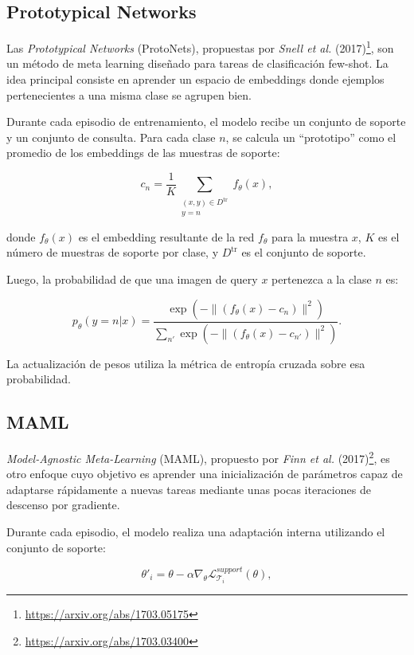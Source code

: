 \subsection{Prototypical Networks}
Las \textit{Prototypical Networks} (ProtoNets), propuestas por \textit{Snell et al.} (2017)\footnote{\url{https://arxiv.org/abs/1703.05175}}, son un método de meta learning diseñado para tareas de clasificación few-shot. La idea principal consiste en aprender un espacio de embeddings donde ejemplos pertenecientes a una misma clase se agrupen bien.

Durante cada episodio de entrenamiento, el modelo recibe un conjunto de soporte y un conjunto de consulta. Para cada clase $n$, se calcula un ``prototipo'' como el promedio de los embeddings de las muestras de soporte:

\begin{equation}
c_n = \frac{1}{K}
\sum_{\substack{(x,y)\in D^{\text{tr}} \\ y=n}}
f_\theta(x),
\end{equation}

donde $f_\theta(x)$ es el embedding resultante de la red $f_\theta$ para la muestra $x$, $K$ es el número de muestras de soporte por clase, y $D^{\text{tr}}$ es el conjunto de soporte.

Luego, la probabilidad de que una imagen de query $x$ pertenezca a la clase $n$ es:

\begin{equation}
p_\theta(y=n|x) =
\frac{
\exp\left(-\|\left(f_\theta(x)-c_n\right)\|^2\right)
}{
\sum_{n'} \exp\left(-\|\left(f_\theta(x)-c_{n'}\right)\|^2\right)
}.
\end{equation}

La actualización de pesos utiliza la métrica de entropía cruzada sobre esa probabilidad.

\subsection{MAML}
\textit{Model-Agnostic Meta-Learning} (MAML), propuesto por \textit{Finn et al.} (2017)\footnote{\url{https://arxiv.org/abs/1703.03400}}, es otro enfoque cuyo objetivo es aprender una inicialización de parámetros capaz de adaptarse rápidamente a nuevas tareas mediante unas pocas iteraciones de descenso por gradiente.

Durante cada episodio, el modelo realiza una adaptación interna utilizando el conjunto de soporte:

\begin{equation}
\theta'_i = \theta - \alpha \nabla_\theta
\mathcal{L}_{\mathcal{T}_i}^{support}(\theta),
\end{equation}

